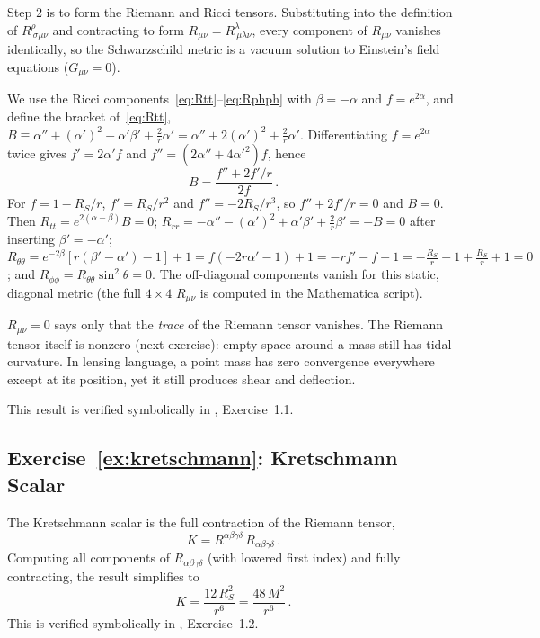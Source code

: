 Step 2 is to form the Riemann and Ricci tensors.
Substituting into the definition of $R^\rho_{\ \sigma\mu\nu}$ and contracting
to form $R_{\mu\nu} = R^\lambda_{\ \mu\lambda\nu}$, every component of
$R_{\mu\nu}$ vanishes identically, so the Schwarzschild metric
is a vacuum solution to Einstein's field equations ($G_{\mu\nu} = 0$).

\begin{derivation}
We use the Ricci components~\eqref{eq:Rtt}--\eqref{eq:Rphph} with $\beta = -\alpha$ and
$f = e^{2\alpha}$, and define the bracket of~\eqref{eq:Rtt},
$B \equiv \alpha'' + (\alpha')^2 - \alpha'\beta' + \tfrac{2}{r}\alpha' = \alpha'' + 2(\alpha')^2 + \tfrac{2}{r}\alpha'$.
Differentiating $f = e^{2\alpha}$ twice gives $f' = 2\alpha' f$ and
$f'' = (2\alpha'' + 4\alpha'^2) f$, hence
\[
    B = \frac{f'' + 2f'/r}{2f} \,.
\]
For $f = 1 - R_S/r$, $f' = R_S/r^2$ and $f'' = -2R_S/r^3$, so $f'' + 2f'/r = 0$ and $B = 0$. Then
$R_{tt} = e^{2(\alpha-\beta)}B = 0$;
$R_{rr} = -\alpha'' - (\alpha')^2 + \alpha'\beta' + \tfrac{2}{r}\beta' = -B = 0$
after inserting $\beta' = -\alpha'$;
$R_{\theta\theta} = e^{-2\beta}[r(\beta' - \alpha') - 1] + 1 = f(-2r\alpha' - 1) + 1
= -r f' - f + 1 = -\tfrac{R_S}{r} - 1 + \tfrac{R_S}{r} + 1 = 0$;
and $R_{\phi\phi} = R_{\theta\theta}\sin^2\theta = 0$.
The off-diagonal components vanish for this static, diagonal metric (the full $4\times4$
$R_{\mu\nu}$ is computed in the Mathematica script).
\end{derivation}

\begin{annotation}
$R_{\mu\nu} = 0$ says only that the \emph{trace} of the Riemann tensor vanishes. The Riemann
tensor itself is nonzero (next exercise): empty space around a mass still has tidal curvature.
In lensing language, a point mass has zero convergence everywhere except at its position, yet
it still produces shear and deflection.
\end{annotation}

This result is verified symbolically in
, Exercise~1.1.

\subsection*{Exercise~\ref{ex:kretschmann}: Kretschmann Scalar}

The Kretschmann scalar is the full contraction of the Riemann tensor,
\begin{equation*}
    K = R^{\alpha\beta\gamma\delta}\, R_{\alpha\beta\gamma\delta} \,.
\end{equation*}
Computing all components of $R_{\alpha\beta\gamma\delta}$ (with lowered first index)
and fully contracting, the result simplifies to
\begin{equation*}
    \boxed{K = \frac{12\, R_S^2}{r^6} = \frac{48\, M^2}{r^6}} \,.
\end{equation*}
This is verified symbolically in
, Exercise~1.2.


